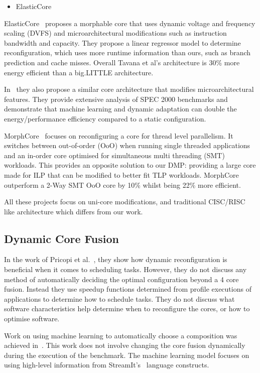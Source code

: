 \begin{itemize}
\item ElasticCore~\cite{tavanaElastic}
\end{itemize}

ElasticCore~\cite{tavanaElastic} proposes a morphable core that uses dynamic voltage and frequency scaling (DVFS) and microarchitectural modifications such as instruction bandwidth and capacity.
They propose a linear regressor model to determine reconfiguration, which uses more runtime information than ours, such as branch prediction and cache misses.
Overall Tavana et al's architecture is 30\% more energy efficient than a big.LITTLE architecture.

In~\cite{dubach13dynamic} they also propose a similar core architecture that modifies microarchitectural features.
They provide extensive analysis of SPEC 2000 benchmarks and demonstrate that machine learning and dynamic adaptation can double the energy/performance efficiency compared to a static configuration.

MorphCore~\cite{khubaibMorphCore2012} focuses on reconfiguring a core for thread level parallelism.
It switches between out-of-order (OoO) when running single threaded applications and an in-order core optimised for simultaneous multi threading (SMT) workloads.
This provides an opposite solution to our DMP: providing a large core made for ILP that can be modified to better fit TLP workloads.
MorphCore outperform a 2-Way SMT OoO core by 10\% whilst being 22\% more efficient.

All these projects focus on uni-core modifications, and traditional CISC/RISC like architecture which differs from our work.

\subsection{Dynamic Core Fusion}
In the work of Pricopi et al.~\cite{pricopiSchedCoreComp2014}, they show how dynamic reconfiguration is beneficial when it comes to scheduling tasks.
However, they do not discuss any method of automatically deciding the optimal configuration beyond a 4 core fusion.
Instead they use speedup functions determined from profile executions of applications to determine how to schedule tasks.
They do not discuss what software characteristics help determine when to reconfigure the cores, or how to optimise software.

Work on using machine learning to automatically choose a composition was achieved in~\cite{micolet2016dmpstream}.
This work does not involve changing the core fusion dynamically during the execution of the benchmark.
The machine learning model focuses on using high-level information from StreamIt's~\cite{thiesStreamit2010} language constructs.


